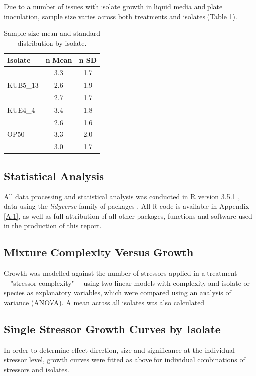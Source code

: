 \documentclass[final,1p,times]{elsarticle}
\begin{document}
Due to a number of issues with isolate growth in liquid media and plate inoculation, sample size varies across both treatments and isolates (Table \ref{tab:samples}). 

\begin{table}[ht]
\centering
\small
\begin{tabular}{l c c}
\toprule 
\textbf{Isolate} & \textbf{n Mean} & \textbf{n SD}  \\
\midrule
\rowcolor{gggrey}{LUF4\_5} & 3.3 & 1.7 \\
{KUB5\_13} & 2.6 & 1.9 \\
\rowcolor{gggrey}{NUF1\_3} & 2.7 & 1.7\\
{KUE4\_4} & 3.4 & 1.8\\
\rowcolor{gggrey}{NUE1\_1} & 2.6 & 1.6\\
{OP50} & 3.3 & 2.0 \\
\rowcolor{gggrey}{Soil Community} & 3.0 & 1.7\\
\bottomrule
\end{tabular}
\caption{Sample size mean and standard distribution by isolate.}
\label{tab:samples}
\end{table}

\subsection{Statistical Analysis}
\label{S:2:6}
All data processing and statistical analysis was conducted in R version 3.5.1 \cite{RCoreTeam2018}, data using the \textit{tidyverse} family of packages \cite{Wickham2017}. All R code is available in Appendix \ref{A:1}, as well as full attribution of all other packages, functions and software used in the production of this report.

\subsection{Mixture Complexity Versus Growth}
\label{S:2:7}
Growth was modelled against the number of stressors applied in a treatment ---"stressor complexity"--- using two linear models with complexity and isolate or species as explanatory variables, which were compared using an analysis of variance (ANOVA). A mean across all isolates was also calculated. 

\subsection{Single Stressor Growth Curves by Isolate}
\label{S:2:8}
In order to determine effect direction, size and significance at the individual stressor level, growth curves were fitted as above for individual combinations of stressors and isolates. 
\end{document}
